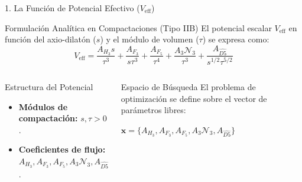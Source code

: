 \documentclass[10pt, aspectratio=169]{beamer}
\begin{document}
\begin{frame}{1. La Función de Potencial Efectivo (\(V_{\text{eff}}\))}
  \begin{block}{Formulación Analítica en Compactaciones (Tipo IIB)}
    El potencial escalar \(V_{\text{eff}}\) en función del axio-dilatón (\(s\)) y el módulo de volumen (\(\tau\)) se expresa como:
    \begin{equation*}
      V_{\text{eff}} = \frac{A_{H_3} s}{\tau^3} + \frac{A_{F_3}}{s \tau^3} + \frac{A_{F_5}}{\tau^4} + \frac{A_3 \mathcal{N}_3}{\tau^3} + \frac{A_{\widehat{D5}}}{s^{1/2} \tau^{5/2}}
    \end{equation*}
  \end{block}

  \begin{columns}
    \begin{block}{Estructura del Potencial}
      \begin{itemize}
        \item \textbf{Módulos de compactación:} \(s, \tau > 0\).
        \item \textbf{Coeficientes de flujo:} \(A_{H_3}, A_{F_3}, A_{F_5}, A_3 \mathcal{N}_3, A_{\widehat{D5}}\).
      \end{itemize}
    \end{block}

    \begin{alertblock}{Espacio de Búsqueda}
      El problema de optimización se define sobre el vector de parámetros libres:
      \begin{center}
        \(\mathbf{x} = \{A_{H_3}, A_{F_3}, A_{F_5}, A_3 \mathcal{N}_3, A_{\widehat{D5}}\}\)
      \end{center}
    \end{alertblock}
  \end{columns}
\end{frame}
\end{document}
